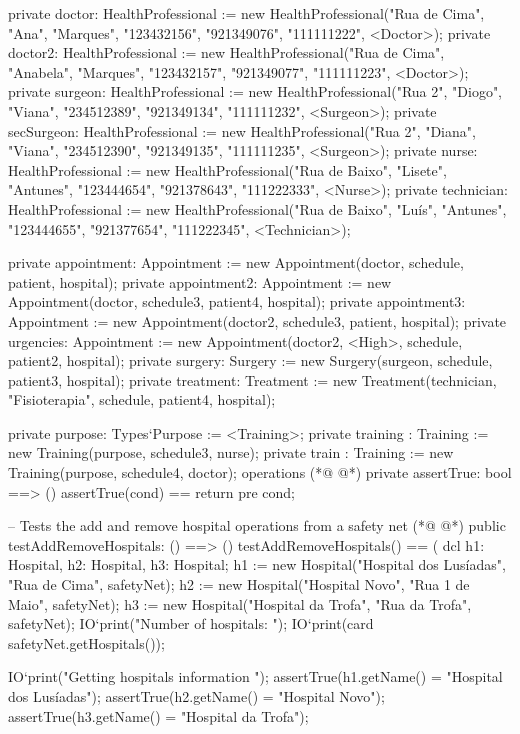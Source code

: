 \begin{vdmpp}[breaklines=true]
  private doctor: HealthProfessional := new HealthProfessional("Rua de Cima", "Ana", "Marques", "123432156", "921349076", "111111222", <Doctor>);
  private doctor2: HealthProfessional := new HealthProfessional("Rua de Cima", "Anabela", "Marques", "123432157", "921349077", "111111223", <Doctor>);
  private surgeon: HealthProfessional := new HealthProfessional("Rua 2", "Diogo", "Viana", "234512389", "921349134", "111111232", <Surgeon>);
  private secSurgeon: HealthProfessional := new HealthProfessional("Rua 2", "Diana", "Viana", "234512390", "921349135", "111111235", <Surgeon>);
 private nurse: HealthProfessional := new HealthProfessional("Rua de Baixo", "Lisete", "Antunes", "123444654", "921378643", "111222333", <Nurse>);
 private technician: HealthProfessional := new HealthProfessional("Rua de Baixo", "Luís", "Antunes", "123444655", "921377654", "111222345", <Technician>);

 private appointment: Appointment := new Appointment(doctor, schedule, patient, hospital);
 private appointment2: Appointment := new Appointment(doctor, schedule3, patient4, hospital);
 private appointment3: Appointment := new Appointment(doctor2, schedule3, patient, hospital);
 private urgencies: Appointment := new Appointment(doctor2, <High>, schedule, patient2, hospital);
 private surgery: Surgery := new Surgery(surgeon, schedule, patient3, hospital);
 private treatment: Treatment := new Treatment(technician, "Fisioterapia", schedule, patient4, hospital);
 
 private purpose: Types`Purpose := <Training>;
 private training : Training := new Training(purpose, schedule3, nurse);
 private train : Training := new Training(purpose, schedule4, doctor);
operations
(*@
\label{assertTrue:60}
@*)
 private assertTrue: bool ==> ()
  assertTrue(cond) == return
 pre cond;
 
 -- Tests the add and remove hospital operations from a safety net
(*@
\label{testAddRemoveHospitals:65}
@*)
 public testAddRemoveHospitals: () ==> ()
  testAddRemoveHospitals() == (
      dcl h1: Hospital, h2: Hospital, h3: Hospital;
      h1 := new Hospital("Hospital dos Lusíadas", "Rua de Cima", safetyNet);
      h2 := new Hospital("Hospital Novo", "Rua 1 de Maio", safetyNet);
      h3 := new Hospital("Hospital da Trofa", "Rua da Trofa", safetyNet);
      IO`print("\n Number of hospitals: ");
      IO`print(card safetyNet.getHospitals());
   
      IO`print("\n\n Getting hospitals information \n");
      assertTrue(h1.getName() = "Hospital dos Lusíadas");
      assertTrue(h2.getName() = "Hospital Novo");
      assertTrue(h3.getName() = "Hospital da Trofa");
      

\end{vdmpp}
